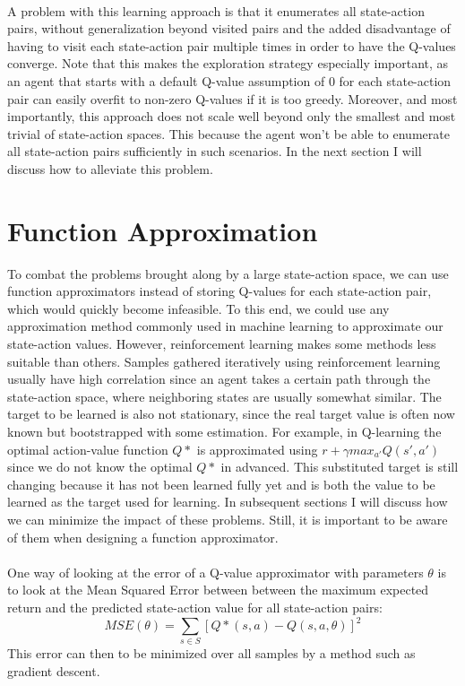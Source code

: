 \paragraph{}
A problem with this learning approach is that
it enumerates all state-action pairs,
without generalization beyond visited pairs
and the added disadvantage of having to visit
each state-action pair multiple times
in order to have the Q-values converge.
Note that this makes the exploration strategy especially important,
as an agent that starts with a default Q-value assumption of 0
for each state-action pair can easily overfit
to non-zero Q-values if it is too greedy.
Moreover, and most importantly,
this approach does not scale well beyond only the smallest and most trivial
of state-action spaces.
This because the agent won't be able to enumerate all state-action pairs
sufficiently in such scenarios.
In the next section I will discuss how to alleviate this problem.

\section{Function Approximation}
To combat the problems brought along by a large state-action space,
we can use function approximators instead of storing Q-values
for each state-action pair,
which would quickly become infeasible.
To this end,
we could use any approximation method commonly used in machine learning
to approximate our state-action values.
However, reinforcement learning makes some methods
less suitable than others.
Samples gathered iteratively using reinforcement learning
usually have high correlation since an agent
takes a certain path through
the state-action space,
where neighboring states are usually somewhat similar.
The target to be learned is also not stationary,
since the real target value is often now known
but bootstrapped with some estimation.
For example,
in Q-learning the optimal action-value function $Q*$
is approximated using $r+\gamma max_{a'}Q(s',a')$
since we do not know the optimal $Q*$ in advanced.
This substituted target is still changing
because it has not been learned fully yet
and is both the value to be learned
as the target used for learning.
In subsequent sections I will discuss
how we can minimize the impact of these problems.
Still, it is important to be aware of them
when designing a function approximator.

\paragraph{}
One way of looking at the error of a Q-value approximator
with parameters $\theta$ is to look at the Mean Squared Error
between between the maximum expected return and
the predicted state-action value for all state-action pairs:
$$MSE(\theta) = \sum_{s \in S}[Q*(s,a)-Q(s,a,\theta)]^2$$
This error can then to be minimized over all samples
by a method such as gradient descent.

